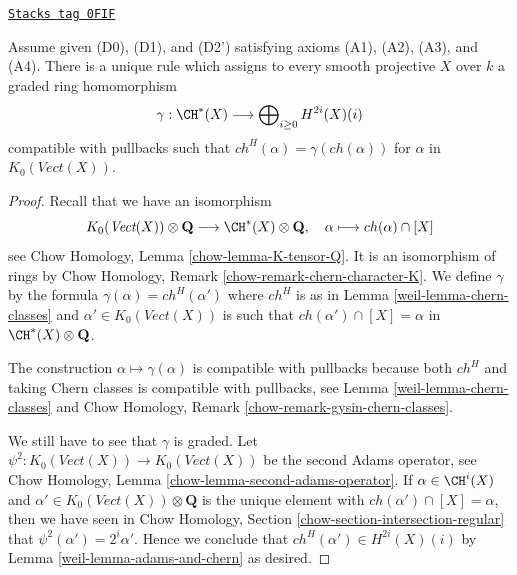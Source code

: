 \begin{lemma}
\label{weil-lemma-cycle-classes}
\href{https://stacks.math.columbia.edu/tag/0FIF}{\texttt{Stacks tag 0FIF}}

Assume given (D0), (D1), and (D2') satisfying axioms (A1), (A2), (A3), and (A4).
There is a unique rule which assigns to every smooth projective $X$ over $k$
a graded ring homomorphism
$$
\gamma : \CH^*(X) \longrightarrow \bigoplus\nolimits_{i \geq 0} H^{2i}(X)(i)
$$
compatible with pullbacks such that $ch^H(\alpha) = \gamma(ch(\alpha))$
for $\alpha$ in $K_0(\textit{Vect}(X))$.
\end{lemma}

\begin{proof}

Recall that we have an isomorphism
$$
K_0(\textit{Vect}(X)) \otimes \mathbf{Q}
\longrightarrow \CH^*(X) \otimes \mathbf{Q},\quad
\alpha \longmapsto ch(\alpha) \cap [X]
$$
see Chow Homology, Lemma \ref{chow-lemma-K-tensor-Q}. It is an isomorphism
of rings by Chow Homology, Remark \ref{chow-remark-chern-character-K}.
We define $\gamma$ by the formula $\gamma(\alpha) = ch^H(\alpha')$
where $ch^H$ is as in Lemma \ref{weil-lemma-chern-classes} and
$\alpha' \in K_0(\textit{Vect}(X))$ is such that
$ch(\alpha') \cap [X] = \alpha$ in $\CH^*(X) \otimes \mathbf{Q}$.

\medskip\noindent
The construction $\alpha \mapsto \gamma(\alpha)$ is compatible
with pullbacks because both $ch^H$ and taking Chern classes
is compatible with pullbacks, see
Lemma \ref{weil-lemma-chern-classes} and
Chow Homology, Remark \ref{chow-remark-gysin-chern-classes}.

\medskip\noindent
We still have to see that $\gamma$ is graded.
Let $\psi^2 : K_0(\textit{Vect}(X)) \to K_0(\textit{Vect}(X))$
be the second Adams operator, see Chow Homology,
Lemma \ref{chow-lemma-second-adams-operator}.
If $\alpha \in \CH^i(X)$ and
$\alpha' \in K_0(\textit{Vect}(X)) \otimes \mathbf{Q}$
is the unique element with $ch(\alpha') \cap [X] = \alpha$,
then we have seen in
Chow Homology, Section \ref{chow-section-intersection-regular}
that $\psi^2(\alpha') = 2^i \alpha'$.
Hence we conclude that $ch^H(\alpha') \in H^{2i}(X)(i)$
by Lemma \ref{weil-lemma-adams-and-chern} as desired.
\end{proof}

